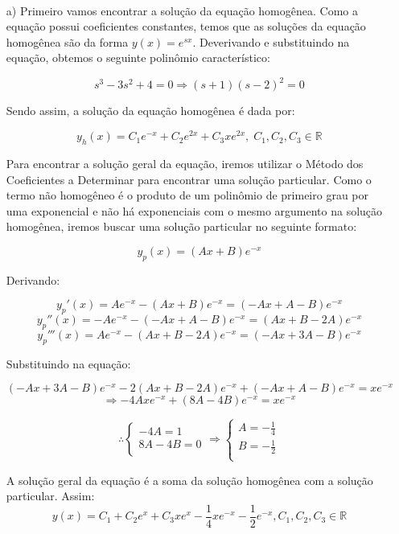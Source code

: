 \documentclass[12pt,a4paper]{article}
\newcommand{\re}{\mathbb{R}}
\begin{document}
 \\

\begin{itemize}
\item[a)] Primeiro vamos encontrar a solução da equação homogênea. Como a equação possui coeficientes constantes, temos que as soluções da equação homogênea são da forma $ y(x) = e^{sx} $. Deverivando e substituindo na equação, obtemos o seguinte polinômio característico:

$$ s^3 - 3s^2 + 4 = 0 \Rightarrow (s+1)(s-2)^2 = 0 $$

Sendo assim, a solução da equação homogênea é dada por:

$$ y_h(x) = C_1 e^{-x} + C_2 e^{2x} + C_3 x e^{2x}, \; C_1, C_2, C_3 \in \re $$

Para encontrar a solução geral da equação, iremos utilizar o Método dos Coeficientes a Determinar para encontrar uma solução particular. Como o termo não homogêneo é o produto de um polinômio de primeiro grau por uma exponencial e não há exponenciais com o mesmo argumento na solução homogênea, iremos buscar uma solução particular no seguinte formato:

$$ y_p(x) = (Ax+B)e^{-x} $$

Derivando:

$$ y_p'(x) = Ae^{-x} - (Ax+B)e^{-x} = (-Ax + A - B)e^{-x} $$
$$ y_p''(x) = - Ae^{-x} - (-Ax + A - B)e^{-x} = (Ax + B - 2A )e^{-x}  $$
$$ y_p'''(x) = Ae^{-x} - (Ax + B - 2A )e^{-x} = (-Ax + 3A - B )e^{-x}  $$

Substituindo na equação:

$$(-Ax + 3A - B )e^{-x} - 2 (Ax + B - 2A )e^{-x} + (-Ax + A - B)e^{-x} = x e^{-x}$$
$$ \Rightarrow -4Axe^{-x} + (8A - 4B)e^{-x} = xe^{-x} $$

$$\therefore
\left\{
\begin{array}{lc}
-4A = 1 \\
8A - 4B = 0 \\
\end{array}
\right.
\Rightarrow
\left\{
\begin{array}{lc}
A = -\frac{1}{4} \\
B = -\frac{1}{2} \\
\end{array}
\right.
$$

A solução geral da equação é a soma da solução homogênea com a solução particular. Assim:
$$ y(x) = C_1 + C_2 e^x + C_3 x e^x -\frac{1}{4} x e^{-x} -\frac{1}{2} e^{-x}  , C_1, C_2, C_3 \in \re $$


\end{itemize}
\end{document}
